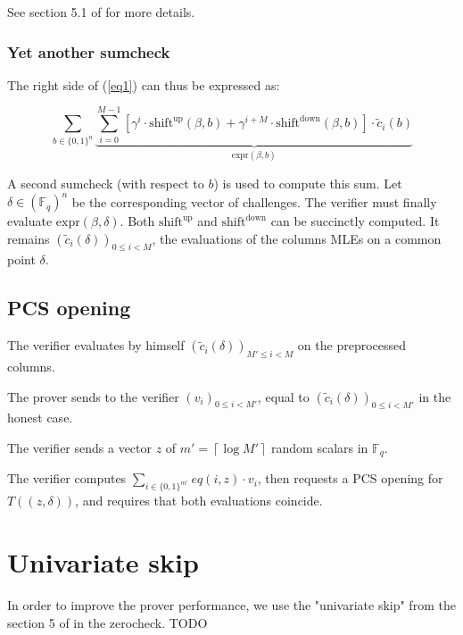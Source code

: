 \documentclass{article}
\newcommand{\Fq}{\mathbb F_q}
\newcommand{\Pol}{T}
\begin{document}
See section 5.1 of \cite{ccs} for more details.

\subsubsection{Yet another sumcheck}

The right side of (\ref{eq1}) can thus be expressed as:

$$\sum_{b \in \{0, 1\}^n} \underbrace{\sum_{i = 0}^{M-1} [\gamma^i \cdot \text{shift}^{\text{up}}(\beta, b) + \gamma^{i+M} \cdot \text{shift}^{\text{down}}(\beta, b) ] \cdot \tilde{c}_i(b)}_{\text{expr}(\beta, b)}$$

A second sumcheck (with respect to $b$) is used to compute this sum. Let $\delta \in (\Fq)^n$ be the corresponding vector of challenges. The verifier must finally evaluate $\text{expr}(\beta, \delta)$. Both $\text{shift}^{\text{up}}$ and $\text{shift}^{\text{down}}$ can be succinctly computed. It remains $(\tilde{c}_i(\delta))_{0 \leq i < M}$, the evaluations of the columns MLEs on a common point $\delta$.

\subsection{PCS opening}

The verifier evaluates by himself $(\tilde{c}_i(\delta))_{M' \leq i < M}$ on the preprocessed columns.

The prover sends to the verifier $(v_i)_{0 \leq i < M'}$, equal to $(\tilde{c}_i(\delta))_{0 \leq i < M'}$ in the honest case.

The verifier sends a vector $z$ of $m' = \left\lceil  \log M' \right\rceil$ random scalars in $\Fq$.

The verifier computes $\sum_{i \in \{0, 1\}^{m'}} eq(i, z) \cdot v_i$, then requests a PCS opening for $\Pol((z, \delta))$, and requires that both evaluations coincide.

\section{Univariate skip}

In order to improve the prover performance, we use the "univariate skip" from the section 5 of \cite{univariate_skip} in the zerocheck. TODO 





\end{document}
